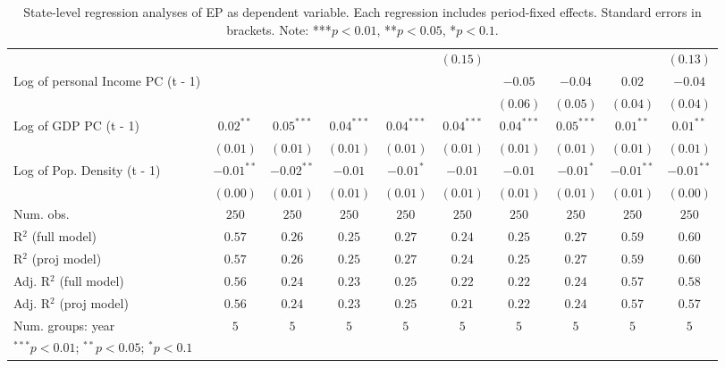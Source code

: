 \begin{table}
\begin{center}
\begin{tabular}{l c c c c c c c c c}
                                  &              &              &              &              & $(0.15)$     &              &              &              & $(0.13)$     \\
Log of personal Income PC (t - 1) &              &              &              &              &              & $-0.05$      & $-0.04$      & $0.02$       & $-0.04$      \\
                                  &              &              &              &              &              & $(0.06)$     & $(0.05)$     & $(0.04)$     & $(0.04)$     \\
Log of GDP PC (t - 1)             & $0.02^{**}$  & $0.05^{***}$ & $0.04^{***}$ & $0.04^{***}$ & $0.04^{***}$ & $0.04^{***}$ & $0.05^{***}$ & $0.01^{**}$  & $0.01^{**}$  \\
                                  & $(0.01)$     & $(0.01)$     & $(0.01)$     & $(0.01)$     & $(0.01)$     & $(0.01)$     & $(0.01)$     & $(0.01)$     & $(0.01)$     \\
Log of Pop. Density (t - 1)       & $-0.01^{**}$ & $-0.02^{**}$ & $-0.01$      & $-0.01^{*}$  & $-0.01$      & $-0.01$      & $-0.01^{*}$  & $-0.01^{**}$ & $-0.01^{**}$ \\
                                  & $(0.00)$     & $(0.01)$     & $(0.01)$     & $(0.01)$     & $(0.01)$     & $(0.01)$     & $(0.01)$     & $(0.01)$     & $(0.00)$     \\
\hline
Num. obs.                         & $250$        & $250$        & $250$        & $250$        & $250$        & $250$        & $250$        & $250$        & $250$        \\
R$^2$ (full model)                & $0.57$       & $0.26$       & $0.25$       & $0.27$       & $0.24$       & $0.25$       & $0.27$       & $0.59$       & $0.60$       \\
R$^2$ (proj model)                & $0.57$       & $0.26$       & $0.25$       & $0.27$       & $0.24$       & $0.25$       & $0.27$       & $0.59$       & $0.60$       \\
Adj. R$^2$ (full model)           & $0.56$       & $0.24$       & $0.23$       & $0.25$       & $0.22$       & $0.22$       & $0.24$       & $0.57$       & $0.58$       \\
Adj. R$^2$ (proj model)           & $0.56$       & $0.24$       & $0.23$       & $0.25$       & $0.21$       & $0.22$       & $0.24$       & $0.57$       & $0.57$       \\
Num. groups: year                 & $5$          & $5$          & $5$          & $5$          & $5$          & $5$          & $5$          & $5$          & $5$          \\
\hline
\multicolumn{10}{l}{\scriptsize{$^{***}p<0.01$; $^{**}p<0.05$; $^{*}p<0.1$}}
\end{tabular}
\caption{State-level regression analyses of EP as dependent variable. Each regression includes period-fixed effects. Standard errors in brackets. Note: ***$p<0.01$, **$p<0.05$, *$p<0.1$.}
\label{tab:epi_1}
\end{center}
\end{table}


